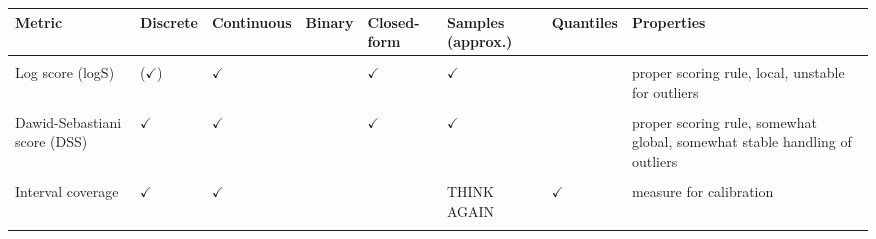 \documentclass[article,shortnames]{jss}\usepackage[]{graphicx}\usepackage[]{color}
\begin{document}
\newpage
\begin{table}[h!]
\centering
\begingroup\fontsize{10}{12}\selectfont

\begin{longtable}[t]{>{\raggedright\arraybackslash}p{2.0 cm}>{\centering\arraybackslash}p{1.4cm}>{\centering\arraybackslash}p{1.4cm}>{\centering\arraybackslash}p{1.2cm}>{\centering\arraybackslash}p{1.2cm}>{\centering\arraybackslash}p{1.4cm}>{\centering\arraybackslash}p{1.2cm}>{\raggedright\arraybackslash}p{4.5cm}}
\toprule
Metric & Discrete & Continuous & Binary & Closed-form & Samples (approx.) & Quantiles & Properties\\
\midrule
\cellcolor{gray!6}{(Continuous) ranked probability score (CRPS)} & \cellcolor{gray!6}{$\checkmark$} & \cellcolor{gray!6}{$\checkmark$} & \cellcolor{gray!6}{} & \cellcolor{gray!6}{$\checkmark$} & \cellcolor{gray!6}{$\checkmark$} & \cellcolor{gray!6}{} & \cellcolor{gray!6}{proper scoring rule, global, stable handling of outliers}\\
\addlinespace
Log score (logS) & ($\checkmark$) & $\checkmark$ &  & $\checkmark$ & $\checkmark$ &  & proper scoring rule, local, unstable for outliers\\
\addlinespace
\cellcolor{gray!6}{(Weighted) interval score (WIS)} & \cellcolor{gray!6}{$\checkmark$} & \cellcolor{gray!6}{$\checkmark$} & \cellcolor{gray!6}{} & \cellcolor{gray!6}{} & \cellcolor{gray!6}{THINK AGAIN} & \cellcolor{gray!6}{$\checkmark$} & \cellcolor{gray!6}{proper scoring rule, global, stable handling of outliers, converges to crps}\\
\addlinespace
Dawid-Sebastiani score (DSS) & $\checkmark$ & $\checkmark$ &  & $\checkmark$ & $\checkmark$ &  & proper scoring rule, somewhat global, somewhat stable handling of outliers\\
\addlinespace
\cellcolor{gray!6}{Brier score (BS)} & \cellcolor{gray!6}{} & \cellcolor{gray!6}{} & \cellcolor{gray!6}{$\checkmark$} & \cellcolor{gray!6}{} & \cellcolor{gray!6}{$\checkmark$} & \cellcolor{gray!6}{} & \cellcolor{gray!6}{proper scoring rule}\\
\addlinespace
Interval coverage & $\checkmark$ & $\checkmark$ &  &  & THINK AGAIN & $\checkmark$ & measure for calibration\\
\addlinespace
\cellcolor{gray!6}{Quantile coverage} & \cellcolor{gray!6}{$\checkmark$} & \cellcolor{gray!6}{$\checkmark$} & \cellcolor{gray!6}{} & \cellcolor{gray!6}{} & \cellcolor{gray!6}{THINK AGAIN} & \cellcolor{gray!6}{$\checkmark$} & \cellcolor{gray!6}{measure for calibration}\\

\end{longtable}
\end{table}
\end{document}
